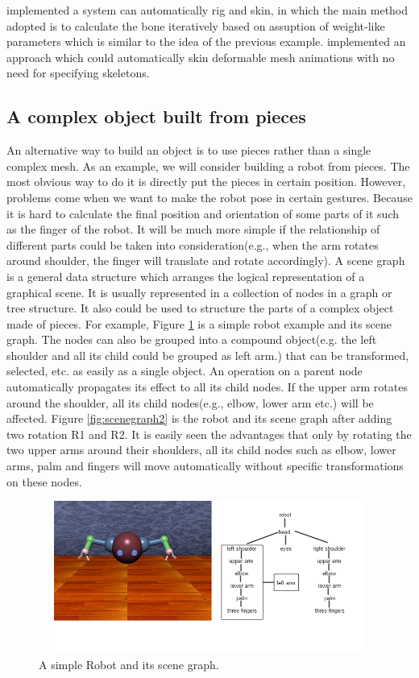 \cite{Rigging1} implemented a system can automatically rig and skin, in which the main method adopted is to calculate the bone iteratively based on assuption of weight-like parameters which is similar to the idea of the previous example. \cite{skinning2} implemented an approach which could automatically skin deformable mesh animations with no need for specifying skeletons.


\subsection{A complex object built from pieces}
An alternative way to build an object is to use pieces rather than a single complex mesh. As an example, we will consider building a robot from pieces. The most obvious way to do it is directly put the
pieces in certain position. However, problems come when we want to make
the robot pose in certain gestures. Because it is hard to calculate the
final position and orientation of some parts of it such as the finger
of the robot. It will be
much more simple if the relationship of different parts could be
taken into consideration(e.g., when the arm rotates around shoulder,
the finger will translate and rotate accordingly). 
A scene graph is a general data structure which arranges the logical representation of a
graphical scene. 
It is usually represented in a collection of nodes in
a graph or tree structure. It also could be used to structure the parts of a complex object made of pieces. For example, Figure \ref{fig:graph3}  is a simple robot example and
its scene graph.  The nodes can also be grouped into a compound object(e.g. the left shoulder and
all its child could be grouped as left arm.) that can be
transformed, selected, etc. as easily as a single object.   
An operation on a parent node automatically
propagates its effect to all its child nodes. If the upper arm rotates around the shoulder, all its
child nodes(e.g., elbow, lower arm etc.) will be affected. Figure
\ref{fig:scenegraph2} is the robot and its scene graph after adding two
rotation R1 and R2. It is easily seen the advantages that only by
rotating the two upper arms around their shoulders, all its child
nodes such as elbow, lower arms, palm and fingers will move
automatically without specific transformations on these nodes.
\begin{figure}[ht!]
\centering
\includegraphics[width=12cm,height=5cm]{figures/figure3.png}
\caption{A simple Robot and its scene graph.}
\label{fig:graph3}
\end{figure}
